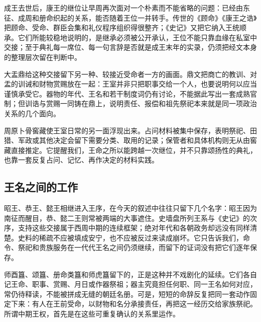 成王去世后，康王的继位让早周再次面对一个朴素而不能省略的问题：已经由东征、成周和册命织起的关系，能否随着王位一并转手。传世的《顾命》《康王之诰》把顾命、受命、群臣会集和礼仪程序组织得很整齐；《史记》又把它纳入王统顺承。它们所能较稳地说明的，是继承必须被公开承认，王位不能只靠血缘在私室中交接；至于典礼每一席位、每一句言辞是否就是成王末年的实录，仍须把经文本身的整理层次留在判断中。

大盂鼎给这种交接留下另一种、较接近受命者一方的画面。鼎文把商亡的教训、对盂的训诫和财物赏赐放在一起：王室并非只把职事交给一个人，也要说明何以应当谨慎承受它。器物的年代、王名和若干制度词仍有讨论，不能据此写出一套成熟官制；但训诰与赏赐一同铸在鼎上，说明责任、报偿和祖先祭祀本来就是同一项政治关系的几个面向。

周原卜骨窖藏使王室日常的另一面浮现出来。占问材料被集中保存，表明祭祀、田猎、军政或其他决定会留下需要分类、取用的记录；保管者和具体机构则无从由窖藏直接推定。它提醒我们，王命之所以能跨越一次继位，并不只靠颂扬性的典礼，也靠一套反复占问、记忆、再作决定的材料实践。

\subsection{王名之间的工作}

昭王、恭王、懿王相继进入王序，在今天的叙述中往往只留下几个名字：昭王因为南征而醒目，恭、懿二王则常被两端的大事遮住。史墙盘所列王系与《史记》的次序，支持这些交接属于西周中期的连续框架；绝对年代和各朝政务却远没有同样清楚。史料的稀疏不应被填成安宁，也不应被反过来读成崩坏。它只告诉我们，命令、祭祀和贵族服务在一代代王名之间仍须继续，而留下的证词没有把它们逐年保存。

师酉簋、颂簋、册命类簋和师虎簋留下的，正是这种并不戏剧化的延续。它们各自记王命、职事、赏赐、月日或作器祭祖；器主究竟担任何职、同一王名如何对应，常仍待释读，不能被拼成无缝的朝廷名册。可是，短短的命辞反复把同一套动作固定下来：有人在王前受命，以财物和名分承接责任，再把这一经历交给家族祭祀。所谓中期王权，首先是在这些可重复确认的关系里运作。

